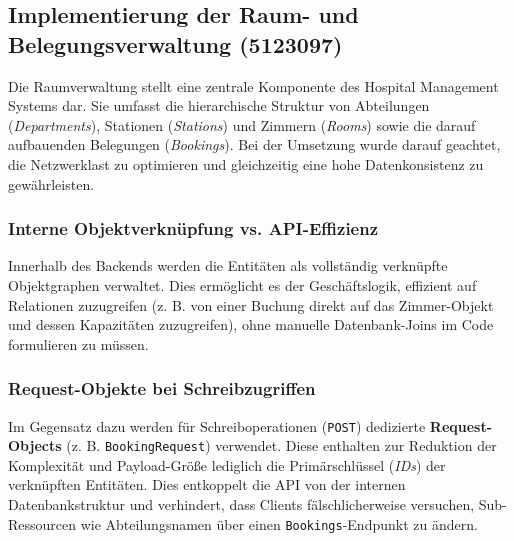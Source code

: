 \subsection{Implementierung der Raum- und Belegungsverwaltung (5123097)}

Die Raumverwaltung stellt eine zentrale Komponente des Hospital Management Systems dar. 
Sie umfasst die hierarchische Struktur von Abteilungen (\textit{Departments}), Stationen (\textit{Stations}) und Zimmern (\textit{Rooms}) sowie die darauf aufbauenden Belegungen (\textit{Bookings}). 
Bei der Umsetzung wurde darauf geachtet, die Netzwerklast zu optimieren und gleichzeitig eine hohe Datenkonsistenz zu gewährleisten.

\subsubsection{Interne Objektverknüpfung vs. API-Effizienz}
Innerhalb des Backends werden die Entitäten als vollständig verknüpfte Objektgraphen verwaltet. 
Dies ermöglicht es der Geschäftslogik, effizient auf Relationen zuzugreifen (z. B. von einer Buchung direkt auf das Zimmer-Objekt und dessen Kapazitäten zuzugreifen), ohne manuelle Datenbank-Joins im Code formulieren zu müssen.




\subsubsection{Request-Objekte bei Schreibzugriffen}
Im Gegensatz dazu werden für Schreiboperationen (\texttt{POST}) dedizierte \textbf{Request-Objects} (z. B. \texttt{BookingRequest}) verwendet. 
Diese enthalten zur Reduktion der Komplexität und Payload-Größe lediglich die Primärschlüssel (\textit{IDs}) der verknüpften Entitäten. 
Dies entkoppelt die API von der internen Datenbankstruktur und verhindert, dass Clients fälschlicherweise versuchen, Sub-Ressourcen wie Abteilungsnamen über einen \texttt{Bookings}-Endpunkt zu ändern.

